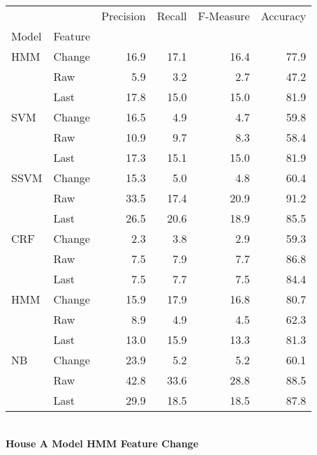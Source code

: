 \documentclass{article}
\begin{document}
\begin{tabular}{llrrrr}
\toprule
    &        &  Precision &  Recall &  F-Measure &  Accuracy \\
Model & Feature &            &         &            &           \\
\midrule
HMM & Change &       16.9 &    17.1 &       16.4 &      77.9 \\
    & Raw &        5.9 &     3.2 &        2.7 &      47.2 \\
    & Last &       17.8 &    15.0 &       15.0 &      81.9 \\
SVM & Change &       16.5 &     4.9 &        4.7 &      59.8 \\
    & Raw &       10.9 &     9.7 &        8.3 &      58.4 \\
    & Last &       17.3 &    15.1 &       15.0 &      81.9 \\
SSVM & Change &       15.3 &     5.0 &        4.8 &      60.4 \\
    & Raw &       33.5 &    17.4 &       20.9 &      91.2 \\
    & Last &       26.5 &    20.6 &       18.9 &      85.5 \\
CRF & Change &        2.3 &     3.8 &        2.9 &      59.3 \\
    & Raw &        7.5 &     7.9 &        7.7 &      86.8 \\
    & Last &        7.5 &     7.7 &        7.5 &      84.4 \\
HMM & Change &       15.9 &    17.9 &       16.8 &      80.7 \\
    & Raw &        8.9 &     4.9 &        4.5 &      62.3 \\
    & Last &       13.0 &    15.9 &       13.3 &      81.3 \\
NB & Change &       23.9 &     5.2 &        5.2 &      60.1 \\
    & Raw &       42.8 &    33.6 &       28.8 &      88.5 \\
    & Last &       29.9 &    18.5 &       18.5 &      87.8 \\
\bottomrule
\end{tabular}
\vspace{1cm}\\
\textbf{House A Model HMM Feature Change}\\
\vspace{1cm}\\
\end{document}
